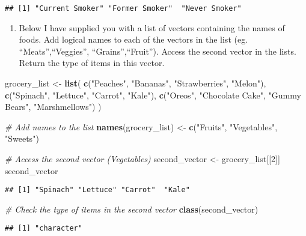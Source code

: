 \documentclass[
]{article}
\newenvironment{Shaded}{\begin{snugshade}}{\end{snugshade}}
\newcommand{\CommentTok}[1]{\textcolor[rgb]{0.56,0.35,0.01}{\textit{#1}}}
\newcommand{\DecValTok}[1]{\textcolor[rgb]{0.00,0.00,0.81}{#1}}
\newcommand{\FunctionTok}[1]{\textcolor[rgb]{0.13,0.29,0.53}{\textbf{#1}}}
\newcommand{\NormalTok}[1]{#1}
\newcommand{\OtherTok}[1]{\textcolor[rgb]{0.56,0.35,0.01}{#1}}
\newcommand{\StringTok}[1]{\textcolor[rgb]{0.31,0.60,0.02}{#1}}
\providecommand{\tightlist}{%
  \setlength{\itemsep}{0pt}\setlength{\parskip}{0pt}}
\begin{document}
\begin{verbatim}
## [1] "Current Smoker" "Former Smoker"  "Never Smoker"
\end{verbatim}

\begin{enumerate}
\def\labelenumi{\arabic{enumi})}
\setcounter{enumi}{10}
\tightlist
\item
  Below I have supplied you with a list of vectors containing the names
  of foods. Add logical names to each of the vectors in the list (eg.
  ``Meats'',``Veggies'', ``Grains'',``Fruit''). Access the second vector
  in the lists. Return the type of items in this vector.
\end{enumerate}

\begin{Shaded}
\begin{Highlighting}[]
\NormalTok{grocery\_list }\OtherTok{\textless{}{-}} \FunctionTok{list}\NormalTok{(}
    \FunctionTok{c}\NormalTok{(}\StringTok{"Peaches"}\NormalTok{, }\StringTok{"Bananas"}\NormalTok{, }\StringTok{"Strawberries"}\NormalTok{, }\StringTok{"Melon"}\NormalTok{),}
    \FunctionTok{c}\NormalTok{(}\StringTok{"Spinach"}\NormalTok{, }\StringTok{"Lettuce"}\NormalTok{, }\StringTok{"Carrot"}\NormalTok{, }\StringTok{"Kale"}\NormalTok{),}
    \FunctionTok{c}\NormalTok{(}\StringTok{"Oreos"}\NormalTok{, }\StringTok{"Chocolate Cake"}\NormalTok{, }\StringTok{"Gummy Bears"}\NormalTok{, }\StringTok{"Marshmellows"}\NormalTok{)}
\NormalTok{)}

\CommentTok{\# Add names to the list}
\FunctionTok{names}\NormalTok{(grocery\_list) }\OtherTok{\textless{}{-}} \FunctionTok{c}\NormalTok{(}\StringTok{"Fruits"}\NormalTok{, }\StringTok{"Vegetables"}\NormalTok{, }\StringTok{"Sweets"}\NormalTok{)}

\CommentTok{\# Access the second vector (Vegetables)}
\NormalTok{second\_vector }\OtherTok{\textless{}{-}}\NormalTok{ grocery\_list[[}\DecValTok{2}\NormalTok{]]}
\NormalTok{second\_vector}
\end{Highlighting}
\end{Shaded}

\begin{verbatim}
## [1] "Spinach" "Lettuce" "Carrot"  "Kale"
\end{verbatim}

\begin{Shaded}
\begin{Highlighting}[]
\CommentTok{\# Check the type of items in the second vector}
\FunctionTok{class}\NormalTok{(second\_vector)}
\end{Highlighting}
\end{Shaded}

\begin{verbatim}
## [1] "character"
\end{verbatim}
\end{document}
